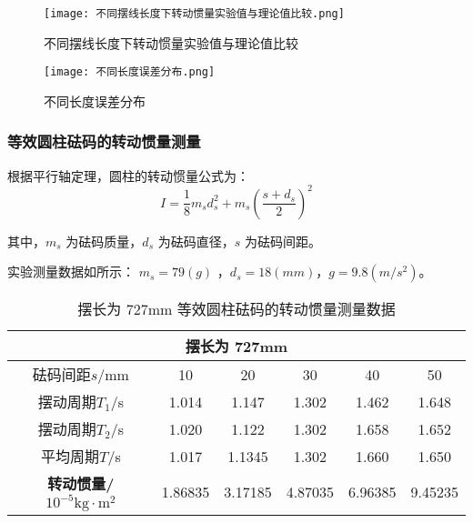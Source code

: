 \begin{figure}[h!]
    \centering
    \begin{minipage}{0.48\textwidth}
        \centering
        \texttt{[image: 不同摆线长度下转动惯量实验值与理论值比较.png]}
        \caption{不同摆线长度下转动惯量实验值与理论值比较}
        \label{fig:comparison_theory_experiment}
    \end{minipage}
    \hfill
    \begin{minipage}{0.48\textwidth}
        \centering
        \texttt{[image: 不同长度误差分布.png]}
        \caption{不同长度误差分布}
        \label{fig:error_distribution}
    \end{minipage}
\end{figure}


\subsubsection{等效圆柱砝码的转动惯量测量}

根据平行轴定理，圆柱的转动惯量公式为：
$$
I = \frac{1}{8} m_s d_s^2 + m_s \left(\frac{s + d_s}{2}\right)^2
$$


其中，$m_s$ 为砝码质量，$d_s$ 为砝码直径，$s$ 为砝码间距。

实验测量数据如所示：
$m_s=79(g)$
，$d_s=18(mm)$，$g=9.8(m/s^2)$。


\begin{table}[h!]
    \centering
    \renewcommand{\arraystretch}{1.5}
    \setlength{\tabcolsep}{8pt}
    \begin{tabular}{|c|c|c|c|c|c|}
    \hline
    \multicolumn{6}{|c|}{\textbf{摆长为 727mm}} \\ \hline
    砝码间距$s$/mm & 10 & 20 & 30 & 40 & 50 \\ \hline
    摆动周期$T_1$/s & 1.014 & 1.147 & 1.302 & 1.462 & 1.648 \\ \hline
    摆动周期$T_2$/s & 1.020 & 1.122 & 1.302 & 1.658 & 1.652 \\ \hline
    平均周期$T$/s & 1.017 & 1.1345 & 1.302 & 1.660 & 1.650 \\ \hline
    \textbf{转动惯量/ $ \mathrm{10^{-5}kg \cdot m^2} $} & 1.86835 & 3.17185 & 4.87035 & 6.96385 & 9.45235 \\ \hline
    \end{tabular}
    \caption{摆长为 727mm 等效圆柱砝码的转动惯量测量数据}
    \label{tab:raw_data_simplified}
\end{table}



